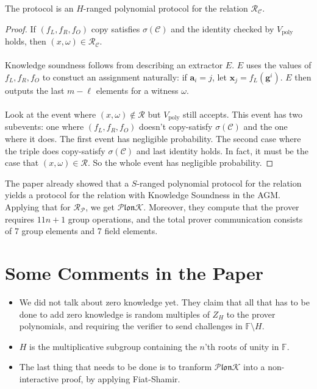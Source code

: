 \documentclass[11pt]{article}
\newcommand{\plonk}{$\mathcal{P} \mathfrak{lon} \mathcal{K}$}
\newcommand{\field}{\mathbb{F}}
\newcommand{\gen}{\mathbf{g}}
\begin{document}
\begin{theorem}
    The protocol is an $H$-ranged polynomial protocol for the relation $\mathcal{R}_\mathscr{C}$.
\end{theorem}
\begin{proof}
    If $(f_L, f_R, f_O)$ copy satisfies $\sigma(\mathscr{C})$ and the identity checked by $V_\text{poly}$ holds, then $(x, \omega) \in \mathcal{R}_\mathscr{C}$.

    \paragraph{} Knowledge soundness follows from describing an extractor $E$. $E$ uses the values of $f_L, f_R, f_O$ to constuct an assignment naturally: if $\mathbf{a}_i = j$, let $\mathbf{x}_j = f_L(\gen^i)$. $E$ then outputs the last $m - \ell$ elements for a witness $\omega$.

    \paragraph{} Look at the event where $(x, \omega) \notin \mathcal{R}$ but $V_\text{poly}$ still accepts. This event has two subevents: one where $(f_L, f_R, f_O)$ doesn't copy-satisfy $\sigma(\mathscr{C})$ and the one where it does. The first event has negligible probability. The second case where the triple does copy-satisfy $\sigma(\mathscr{C})$ and last identity holds. In fact, it must be the case that $(x, \omega) \in \mathcal{R}$. So the whole event has negligible probability.
\end{proof}

The paper already showed that a $S$-ranged polynomial protocol for the relation yields a protocol for the relation with Knowledge Soundness in the AGM. Applying that for $\mathcal{R}_\mathscr{P}$, we get \plonk{}. Moreover, they compute that the prover requires $11n + 1$ group operations, and the total prover communication consists of 7 group elements and 7 field elements.

\section{Some Comments in the Paper}
\begin{itemize}
    \item We did not talk about zero knowledge yet. They claim that all that has to be done to add zero knowledge is random multiples of $Z_H$ to the prover polynomials, and requiring the verifier to send challenges in $\field{} \setminus H$.
    \item $H$ is the multiplicative subgroup containing the $n$'th roots of unity in $\field{}$.
    \item The last thing that needs to be done is to tranform \plonk{} into a non-interactive proof, by applying Fiat-Shamir.
\end{itemize}



\end{document}
